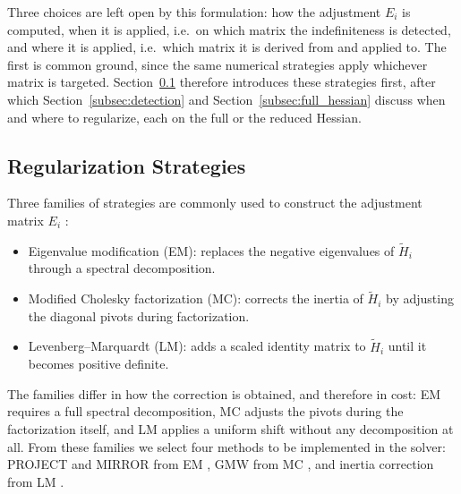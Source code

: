 \documentclass[class=scrbook, crop=false]{standalone}
\begin{document}
Three choices are left open by this formulation: 
how the adjustment $E_i$ is computed,
when it is applied, i.e.\ on which matrix the indefiniteness is detected,
and where it is applied, i.e.\ which matrix it is derived from and applied to.
The first is common ground,
since the same numerical strategies apply whichever matrix is targeted.
Section~\ref{subsec:reg_strategies} therefore introduces these strategies first,
after which Section~\ref{subsec:detection} and Section~\ref{subsec:full_hessian} discuss when and where to regularize,
each on the full or the reduced Hessian.

\subsection{Regularization Strategies}
\label{subsec:reg_strategies}
Three families of strategies are commonly used to construct the adjustment matrix $E_i$
\cite{nocedal2006numerical, mcsweeneyModifiedCholeskyDecomposition2017, More1978levenberg}:
\begin{itemize}
    \item Eigenvalue modification (EM): replaces the negative eigenvalues of $\tilde{H}_i$ through a spectral decomposition.
    \item Modified Cholesky factorization (MC): corrects the inertia of $\tilde{H}_i$ by adjusting the diagonal pivots during factorization.
    \item Levenberg--Marquardt (LM): adds a scaled identity matrix to $\tilde{H}_i$ until it becomes positive definite.
\end{itemize}
The families differ in how the correction is obtained, and therefore in cost:
EM requires a full spectral decomposition, 
MC adjusts the pivots during the factorization itself,
and LM applies a uniform shift without any decomposition at all.
From these families we select four methods to be implemented in the solver:
PROJECT and MIRROR from EM \cite{verschueren2017sparsity},
GMW from MC \cite{gill1981practical},
and inertia correction from LM \cite{wachter2006implementation}.
\end{document}
